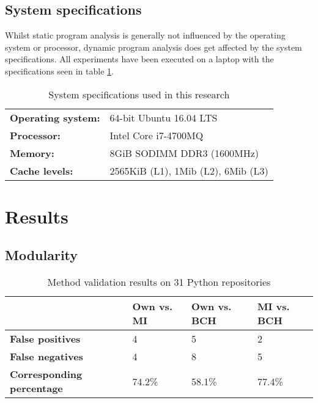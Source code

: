 \documentclass[twoside]{uva-inf-bachelor-thesis}
\begin{document}
\section{System specifications}
Whilst static program analysis is generally not influenced by the operating system or processor, dynamic program analysis does get affected by the system specifications. All experiments have been executed on a laptop with the specifications seen in table \ref{table:specifications}.
\begin{table}[H]
\centering
\caption{System specifications used in this research}
\label{table:specifications}
\begin{tabular}{ll}
\textbf{Operating system:} & 64-bit Ubuntu 16.04 LTS    \\
\textbf{Processor:}        & Intel Core i7-4700MQ       \\
\textbf{Memory:}           & 8GiB SODIMM DDR3 (1600MHz) \\
\textbf{Cache levels:}     & 2565KiB (L1), 1Mib (L2), 6Mib (L3) \\
\end{tabular}
\end{table}

\chapter{Results}
\section{Modularity}

\begin{table}[H]
\centering
\caption{Method validation results on 31 Python repositories}
\label{table:validation}
\begin{tabular}{l|lll}
\textbf{}                         & \textbf{Own vs. MI} & \textbf{Own vs. BCH} & \textbf{MI vs. BCH} \\ \hline
\textbf{False positives}          & 4                   & 5                    & 2                   \\
\textbf{False negatives}          & 4                   & 8                    & 5                   \\
\textbf{Corresponding percentage} & 74.2\%              & 58.1\%               & 77.4\%             
\end{tabular}
\end{table}
\end{document}
